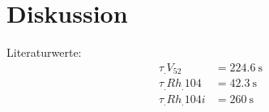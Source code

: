 
\section{Diskussion}
\label{sec:Diskussion}

Literaturwerte\cite{Halbwertszeiten}: 
\begin{align*}
\tau_.{V_{52}}		&=\SI{224.6}{\second}\\
\tau_.{Rh_.{104}}	&=\SI{42.3}{\second}\\
\tau_.{Rh_.{104i}}	&=\SI{260}{\second}
\end{align*}
